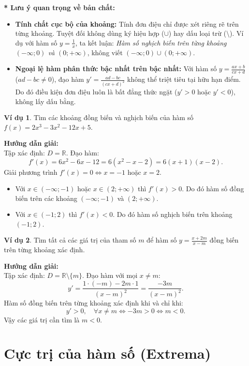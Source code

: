 \documentclass[12pt,a4paper]{article}
\theoremstyle{definition}
\newtheorem{vd}{Ví dụ}[section]
\begin{document}
\noindent \textbf{* Lưu ý quan trọng về bản chất:}
\begin{itemize}
    \item \textbf{Tính chất cục bộ của khoảng:} Tính đơn điệu chỉ được xét riêng rẽ trên từng khoảng. Tuyệt đối không dùng ký hiệu hợp ($\cup$) hay dấu loại trừ ($\setminus$). Ví dụ với hàm số $y = \frac{1}{x}$, ta kết luận: \textit{Hàm số nghịch biến trên từng khoảng $(-\infty; 0)$ và $(0; +\infty)$}, không viết $(-\infty; 0) \cup (0; +\infty)$.
    \item \textbf{Ngoại lệ hàm phân thức bậc nhất trên bậc nhất:} Với hàm số $y = \frac{ax+b}{cx+d}$ ($ad - bc \ne 0$), đạo hàm $y' = \frac{ad-bc}{(cx+d)^2}$ không thể triệt tiêu tại hữu hạn điểm. Do đó điều kiện đơn điệu luôn là bất đẳng thức ngặt ($y' > 0$ hoặc $y' < 0$), không lấy dấu bằng.
\end{itemize}

\begin{vd}
Tìm các khoảng đồng biến và nghịch biến của hàm số $f(x) = 2x^3 - 3x^2 - 12x + 5$.
\end{vd}
\noindent \textbf{Hướng dẫn giải:} \\
Tập xác định: $D = \mathbb{R}$. Đạo hàm:
\[
f'(x) = 6x^2 - 6x - 12 = 6(x^2 - x - 2) = 6(x + 1)(x - 2).
\]
Giải phương trình $f'(x) = 0 \iff x = -1$ hoặc $x = 2$.
\begin{itemize}
    \item Với $x \in (-\infty; -1)$ hoặc $x \in (2; +\infty)$ thì $f'(x) > 0$. Do đó hàm số đồng biến trên các khoảng $(-\infty; -1)$ và $(2; +\infty)$.
    \item Với $x \in (-1; 2)$ thì $f'(x) < 0$. Do đó hàm số nghịch biến trên khoảng $(-1; 2)$.
\end{itemize}

\begin{vd}
Tìm tất cả các giá trị của tham số $m$ để hàm số $y = \frac{x + 2m}{x - m}$ đồng biến trên từng khoảng xác định.
\end{vd}
\noindent \textbf{Hướng dẫn giải:} \\
Tập xác định: $D = \mathbb{R} \setminus \{m\}$. Đạo hàm với mọi $x \ne m$:
\[
y' = \frac{1 \cdot (-m) - 2m \cdot 1}{(x - m)^2} = \frac{-3m}{(x - m)^2}.
\]
Hàm số đồng biến trên từng khoảng xác định khi và chỉ khi:
\[
y' > 0, \quad \forall x \ne m \iff -3m > 0 \iff m < 0.
\]
Vậy các giá trị cần tìm là $m < 0$.

\vspace{5mm}
\section{Cực trị của hàm số (Extrema)}
\end{document}
